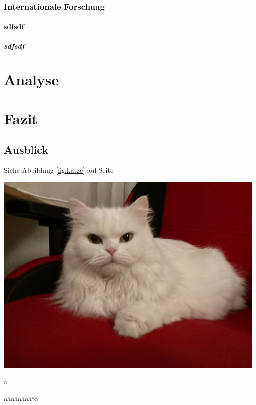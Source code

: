 \documentclass[12pt,ngerman,parskip=half]{scrartcl}
\begin{document}
\subsubsection{Internationale Forschung}

\blindtext

\paragraph{sdfsdf} \blindtext

\subparagraph{sdfsdf} \blindtext


\section{Analyse}

\blindtext[5]

\section{Fazit}

\subsection{Ausblick}\label{sec:ausblick} 

Siehe Abbildung \ref{fig:katze} auf Seite \pageref{fig:katze}

\begin{center}
\includegraphics[width=\textwidth]{Bilder/Katze}
\end{center}
\label{fig:katze2}


\blindtext

\"a


öäöäöäöäöä
\end{document}
